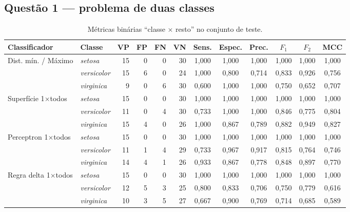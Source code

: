 \documentclass[12pt,a4paper]{article}
\newcommand{\setosa}{\emph{setosa}}
\newcommand{\versicolor}{\emph{versicolor}}
\newcommand{\virginica}{\emph{virginica}}
\begin{document}
\subsection{Questão 1 --- problema de duas classes}

\begin{table}[H]
\centering
\caption{Métricas binárias ``classe $\times$ resto'' no conjunto de teste.}
\label{tab:binarias}
\footnotesize
\setlength{\tabcolsep}{4pt}
\begin{tabular}{llrrrrcccccc}
\toprule
Classificador & Classe & VP & FP & FN & VN & Sens. & Espec. & Prec. & $F_1$ & $F_2$ & MCC \\
\midrule
\multirow{3}{*}{Dist. mín. / Máximo}
 & \setosa{}     & 15 & 0 & 0 & 30 & 1,000 & 1,000 & 1,000 & 1,000 & 1,000 & 1,000 \\
 & \versicolor{} & 15 & 6 & 0 & 24 & 1,000 & 0,800 & 0,714 & 0,833 & 0,926 & 0,756 \\
 & \virginica{}  & 9  & 0 & 6 & 30 & 0,600 & 1,000 & 1,000 & 0,750 & 0,652 & 0,707 \\
\midrule
\multirow{3}{*}{Superfície 1$\times$todos}
 & \setosa{}     & 15 & 0 & 0 & 30 & 1,000 & 1,000 & 1,000 & 1,000 & 1,000 & 1,000 \\
 & \versicolor{} & 11 & 0 & 4 & 30 & 0,733 & 1,000 & 1,000 & 0,846 & 0,775 & 0,804 \\
 & \virginica{}  & 15 & 4 & 0 & 26 & 1,000 & 0,867 & 0,789 & 0,882 & 0,949 & 0,827 \\
\midrule
\multirow{3}{*}{Perceptron 1$\times$todos}
 & \setosa{}     & 15 & 0 & 0 & 30 & 1,000 & 1,000 & 1,000 & 1,000 & 1,000 & 1,000 \\
 & \versicolor{} & 11 & 1 & 4 & 29 & 0,733 & 0,967 & 0,917 & 0,815 & 0,764 & 0,746 \\
 & \virginica{}  & 14 & 4 & 1 & 26 & 0,933 & 0,867 & 0,778 & 0,848 & 0,897 & 0,770 \\
\midrule
\multirow{3}{*}{Regra delta 1$\times$todos}
 & \setosa{}     & 15 & 0 & 0 & 30 & 1,000 & 1,000 & 1,000 & 1,000 & 1,000 & 1,000 \\
 & \versicolor{} & 12 & 5 & 3 & 25 & 0,800 & 0,833 & 0,706 & 0,750 & 0,779 & 0,616 \\
 & \virginica{}  & 10 & 3 & 5 & 27 & 0,667 & 0,900 & 0,769 & 0,714 & 0,685 & 0,589 \\
\bottomrule
\end{tabular}
\end{table}
\end{document}
